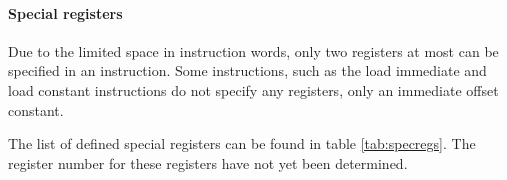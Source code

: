 

\paragraph{Special registers}

Due to the limited space in instruction words, only two registers at most can be
specified in an instruction. Some instructions, such as the load immediate and
load constant instructions do not specify any registers, only an immediate
offset constant.

The list of defined special registers can be found in table \ref{tab:specregs}.
The register number for these registers have not yet been determined.



